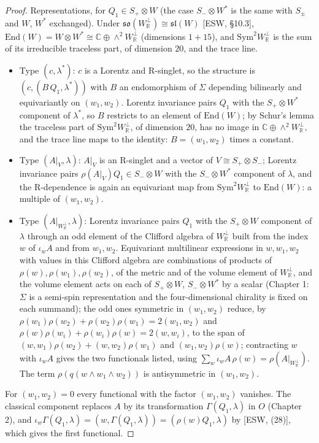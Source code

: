 \begin{proof}
Representations, for $Q_1\in S_+\otimes W$ (the case $S_-\otimes W^*$ is the same with $S_\pm$ and $W$, $W^*$ exchanged). Under $\mathfrak{so}(W_{\mathbb R}^\perp)\cong\mathfrak{sl}(W)$ [ESW, §10.3], $\mathrm{End}(W)=W\otimes W^*\cong\mathbb C\oplus\wedge^2W_{\mathbb R}^\perp$ (dimensions $1+15$), and $\mathrm{Sym}^2W_{\mathbb R}^\perp$ is the sum of its irreducible traceless part, of dimension $20$, and the trace line.
\begin{itemize}
\item Type $(c,\lambda^*)$: $c$ is a Lorentz and R-singlet, so the structure is $(c,(B\,Q_1,\lambda^*))$ with $B$ an endomorphism of $\Sigma$ depending bilinearly and equivariantly on $(w_1,w_2)$. Lorentz invariance pairs $Q_1$ with the $S_+\otimes W^*$ component of $\lambda^*$, so $B$ restricts to an element of $\mathrm{End}(W)$; by Schur's lemma the traceless part of $\mathrm{Sym}^2W_{\mathbb R}^\perp$, of dimension $20$, has no image in $\mathbb C\oplus\wedge^2W_{\mathbb R}^\perp$, and the trace line maps to the identity: $B=(w_1,w_2)$ times a constant.
\item Type $(A|_V,\lambda)$: $A|_V$ is an R-singlet and a vector of $V\cong S_+\otimes S_-$; Lorentz invariance pairs $\rho(A|_V)Q_1\in S_-\otimes W$ with the $S_-\otimes W^*$ component of $\lambda$, and the R-dependence is again an equivariant map from $\mathrm{Sym}^2W_{\mathbb R}^\perp$ to $\mathrm{End}(W)$: a multiple of $(w_1,w_2)$.
\item Type $(A|_{W_{\mathbb R}^\perp},\lambda)$: Lorentz invariance pairs $Q_1$ with the $S_+\otimes W$ component of $\lambda$ through an odd element of the Clifford algebra of $W_{\mathbb R}^\perp$ built from the index $w$ of $\iota_wA$ and from $w_1,w_2$. Equivariant multilinear expressions in $w,w_1,w_2$ with values in this Clifford algebra are combinations of products of $\rho(w),\rho(w_1),\rho(w_2)$, of the metric and of the volume element of $W_{\mathbb R}^\perp$, and the volume element acts on each of $S_+\otimes W$, $S_-\otimes W^*$ by a scalar (Chapter 1: $\Sigma$ is a semi-spin representation and the four-dimensional chirality is fixed on each summand); the odd ones symmetric in $(w_1,w_2)$ reduce, by $\rho(w_1)\rho(w_2)+\rho(w_2)\rho(w_1)=2(w_1,w_2)$ and $\rho(w)\rho(w_i)+\rho(w_i)\rho(w)=2(w,w_i)$, to the span of $(w,w_1)\rho(w_2)+(w,w_2)\rho(w_1)$ and $(w_1,w_2)\rho(w)$; contracting $w$ with $\iota_wA$ gives the two functionals listed, using $\sum_w\iota_wA\,\rho(w)=\rho(A|_{W_{\mathbb R}^\perp})$. The term $\rho(q(w\wedge w_1\wedge w_2))$ is antisymmetric in $(w_1,w_2)$.
\end{itemize}
For $(w_1,w_2)=0$ every functional with the factor $(w_1,w_2)$ vanishes. The classical component replaces $A$ by its transformation $\Gamma(Q_1,\lambda)$ in $O$ (Chapter 2), and $\iota_w\Gamma(Q_1,\lambda)=(w,\Gamma(Q_1,\lambda))=(\rho(w)Q_1,\lambda)$ by [ESW, (28)], which gives the first functional.
\end{proof}


